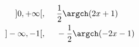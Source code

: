 \begin{align*}
 ]0,+\infty[,&\hspace{0.5cm}\frac{1}{2}\argch(2x+1)\\
 ]-\infty,-1[,&\hspace{0.5cm}-\frac{1}{2}\argch(-2x-1)
\end{align*}
